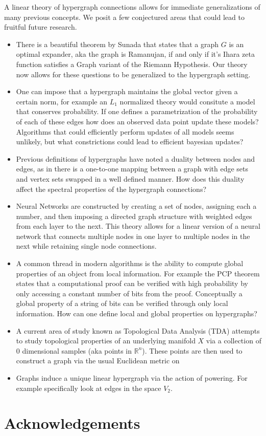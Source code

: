 \documentclass{article}
\begin{document}
A linear theory of hypergraph connections allows for immediate generalizations of many previous concepts. We posit a few conjectured areas that could lead to fruitful future research.
\begin{itemize}
    \item There is a beautiful theorem by Sunada that states that a graph $G$ is an optimal expander, aka the graph is Ramanujan, if and only if it's Ihara zeta function satisfies a Graph variant of the Riemann Hypothesis. Our theory now allows for these questions to be generalized to the hypergraph setting.
    \item One can impose that a hypergraph maintains the global vector given a certain norm, for example an $L_1$ normalized theory would consitute a model that conserves probability. If one defines a parametrization of the probability of each of these edges how does an observed data point update these models? Algorithms that could efficiently perform updates of all models seems unlikely, but what constrictions could lead to efficient bayesian updates?
    \item Previous definitions of hypergraphs have noted a duality between nodes and edges, as in there is a one-to-one mapping between a graph with edge sets and vertex sets swapped in a well defined manner. How does this duality affect the spectral properties of the hypergraph connections?
    \item Neural Networks are constructed by creating a set of nodes, assigning each a number, and then imposing a directed graph structure with weighted edges from each layer to the next. This theory allows for a linear version of a neural network that connects multiple nodes in one layer to multiple nodes in the next while retaining single node connections.
    \item A common thread in modern algorithms is the ability to compute global properties of an object from local information. For example the PCP theorem states that a computational proof can be verified with high probability by only accessing a constant number of bits from the proof. Conceptually a global property of a string of bits can be verified through only local information. How can one define local and global properties on hypergraphs?
    \item  A current area of study known as Topological Data Analysis (TDA) attempts to study topological properties of an underlying manifold $X$ via a collection of 0 dimensional samples (aka points in $\mathbb{R}^n$). These points are then used to construct a graph via the usual Euclidean metric on
    \item Graphs induce a unique linear hypergraph via the action of powering. For example specifically look at edges in the space $V_2$.  
\end{itemize}

\section*{Acknowledgements}



\end{document}
